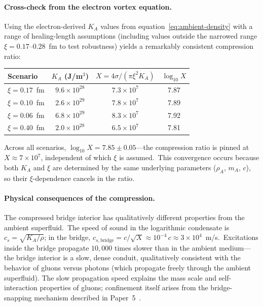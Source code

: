 ﻿\documentclass[12pt,letterpaper]{article}
\newcommand{\rhoa}{\rho_{\!A}}
\newcommand{\Ka}{K_{\!A}}
\begin{document}
\paragraph{Cross-check from the electron vortex equation.}
Using the electron-derived $\Ka$ values from
equation~\eqref{eq:ambient-density} with a range of healing-length assumptions
(including values outside the narrowed range $\xi = 0.17$--$0.28$~fm to test
robustness) yields a remarkably consistent compression ratio:
%
\begin{center}
\begin{tabular}{@{}lccc@{}}
\hline
\textbf{Scenario} & $\Ka$ (J/m$^3$) & $X = 4\sigma/(\pi\xi^2\Ka)$ & $\log_{10} X$ \\
\hline
$\xi = 0.17$~fm  & $9.6 \times 10^{28}$ & $7.3 \times 10^{7}$ & 7.87 \\
$\xi = 0.10$~fm  & $2.6 \times 10^{29}$ & $7.8 \times 10^{7}$ & 7.89 \\
$\xi = 0.06$~fm  & $6.8 \times 10^{29}$ & $8.3 \times 10^{7}$ & 7.92 \\
$\xi = 0.40$~fm  & $2.0 \times 10^{28}$ & $6.5 \times 10^{7}$ & 7.81 \\
\hline
\end{tabular}
\end{center}
%
Across all scenarios, $\log_{10} X = 7.85 \pm 0.05$---the compression ratio is
pinned at $X \approx 7 \times 10^7$, independent of which $\xi$ is assumed.\
This convergence occurs because both $\Ka$ and $\xi$ are determined by the same
underlying parameters ($\rhoa$, $m_A$, $c$), so their $\xi$-dependence cancels
in the ratio.

\paragraph{Physical consequences of the compression.}
The compressed bridge interior has qualitatively different properties from the
ambient superfluid.\ The speed of sound in the logarithmic condensate is
$c_s = \sqrt{\Ka/\rho}$; in the bridge, $c_{s,\mathrm{bridge}} = c / \sqrt{X}
\approx 10^{-4}\,c \approx 3 \times 10^4$~m/s.\ Excitations inside the bridge
propagate $10{,}000$ times slower than in the ambient medium---the bridge
interior is a slow, dense conduit, qualitatively consistent with the behavior
of gluons versus photons (which propagate
freely through the ambient superfluid).
The slow propagation speed explains the mass scale and self-interaction
properties of gluons; confinement itself arises from the bridge-snapping
mechanism described in Paper~5~\cite{otto-strong}.
\end{document}
